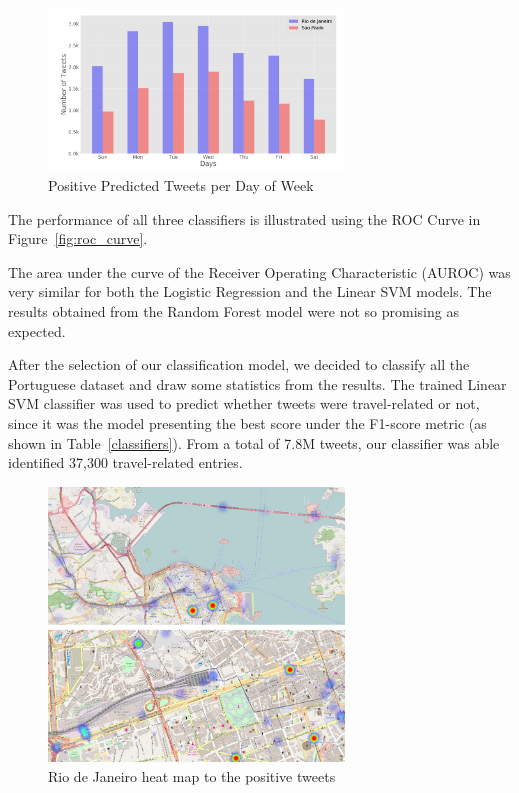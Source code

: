 \begin{figure}[!hbp]
	\centering
	\includegraphics[width=0.7\textwidth]{figures/predicted_day_of_week}
	\caption{Positive Predicted Tweets per Day of Week}
	\label{fig:predicted}
\end{figure}


The performance of all three classifiers is illustrated using the ROC Curve in Figure~\ref{fig:roc_curve}.

The area under the curve of the Receiver Operating Characteristic (AUROC) was very similar for both the Logistic Regression and the Linear SVM models. The results obtained from the Random Forest model were not so promising as expected.

After the selection of our classification model, we decided to classify all the Portuguese dataset and draw some statistics from the results. The trained Linear SVM classifier was used to predict whether tweets were travel-related or not, since it was the model presenting the best score under the F1-score metric (as shown in Table~\ref{classifiers}). From a total of 7.8M tweets, our classifier was able identified 37,300 travel-related entries.

\begin{figure}[!bp]
	\centering
	\includegraphics[width=0.7\textwidth]{figures/rio_1}
	\caption{Rio de Janeiro heat map to the positive tweets}
	\label{subfig:rio_heatmap}
\end{figure}

